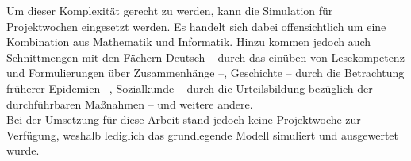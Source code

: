    Um dieser Komplexität gerecht zu werden, kann die Simulation für Projektwochen eingesetzt werden. Es handelt sich dabei offensichtlich um eine Kombination aus Mathematik und Informatik. Hinzu kommen jedoch auch Schnittmengen mit den Fächern Deutsch -- durch das einüben von Lesekompetenz und Formulierungen über Zusammenhänge --, Geschichte -- durch die Betrachtung früherer Epidemien --, Sozialkunde -- durch die Urteilsbildung bezüglich der durchführbaren Maßnahmen -- und weitere andere.\\
   Bei der Umsetzung für diese Arbeit stand jedoch keine Projektwoche zur Verfügung, weshalb lediglich das grundlegende Modell simuliert und ausgewertet wurde.
